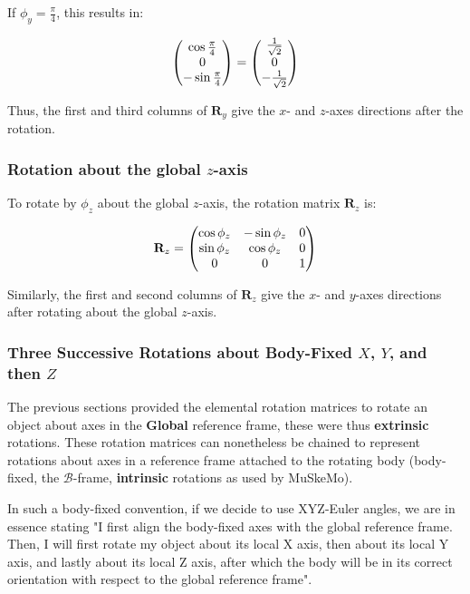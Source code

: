 \documentclass{article}
\begin{document}
If \( \phi_y = \frac{\pi}{4} \), this results in:

\begin{equation}
\mqty( \cos \frac{\pi}{4} \\ 0 \\ -\sin \frac{\pi}{4} ) = \mqty( \frac{1}{\sqrt{2}} \\ 0 \\ -\frac{1}{\sqrt{2}} )
\end{equation}

Thus, the first and third columns of \( \mathbf{R}_y \) give the \( x \)- and \( z \)-axes directions after the rotation.

\subsubsection*{Rotation about the global \( z \)-axis}

To rotate by \( \phi_z \) about the global \( z \)-axis, the rotation matrix \( \mathbf{R}_z \) is:

\begin{equation}
\mathbf{R}_z = \mqty(
\cos \phi_z & -\sin \phi_z & 0 \\
\sin \phi_z & \cos \phi_z & 0 \\
0 & 0 & 1
)
\label{eq:Rz}
\end{equation}

Similarly, the first and second columns of \( \mathbf{R}_z \) give the \( x \)- and \( y \)-axes directions after rotating about the global \( z \)-axis.


\subsubsection*{Three Successive Rotations about Body-Fixed \(X\), \(Y\), and then \(Z\)}

The previous sections provided the elemental rotation matrices to rotate an object about axes in the \textbf{Global} reference frame, these were thus \textbf{extrinsic} rotations. These rotation matrices can nonetheless be chained to represent rotations about axes in a reference frame attached to the rotating body (body-fixed, the \( \mathcal{B} \)-frame, \textbf{intrinsic} rotations as used by MuSkeMo).

In such a body-fixed convention, if we decide to use XYZ-Euler angles, we are in essence stating "I first align the body-fixed axes with the global reference frame. Then, I will first rotate my object about its local X axis, then about its local Y axis, and lastly about its local Z axis, after which the body will be in its correct orientation with respect to the global reference frame".
\end{document}
